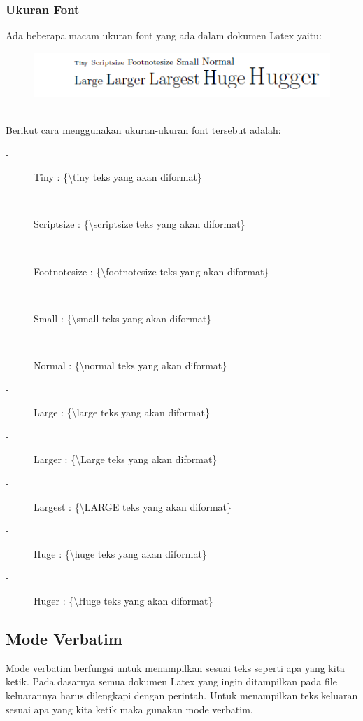 \subsubsection{Ukuran Font}
Ada beberapa macam ukuran font yang ada dalam dokumen Latex yaitu:
\begin{figure}[h!]
\centering
\includegraphics[width=  10 cm]{img/2.png}
\end{figure}
\\
Berikut cara menggunakan ukuran-ukuran font tersebut adalah:
\begin{description}
\item[-]Tiny : \{\textbackslash tiny teks yang akan diformat\}
\item[-] Scriptsize : \{\textbackslash scriptsize teks yang akan diformat\}
\item[-] Footnotesize : \{\textbackslash  footnotesize  teks yang akan diformat\}
\item[-] Small : \{\textbackslash small teks yang akan diformat\}
\item[-] Normal :  \{\textbackslash normal teks yang akan diformat\}
\item[-] Large :  \{\textbackslash large teks yang akan diformat\}
\item[-] Larger :  \{\textbackslash Large teks yang akan diformat\}
\item[-] Largest : \{\textbackslash LARGE teks yang akan diformat\}
\item[-] Huge :  \{\textbackslash huge teks yang akan diformat\}
\item[-] Huger :  \{\textbackslash Huge teks yang akan diformat\}
\end{description}
\subsection{Mode Verbatim}
\begin{raggedleft}Mode verbatim berfungsi untuk menampilkan sesuai teks seperti apa yang kita ketik. Pada dasarnya semua dokumen Latex yang ingin ditampilkan pada file keluarannya harus dilengkapi dengan perintah. Untuk menampilkan teks keluaran sesuai apa yang kita ketik maka gunakan mode verbatim.\end{raggedleft}
\vspace{0.5 cm}

